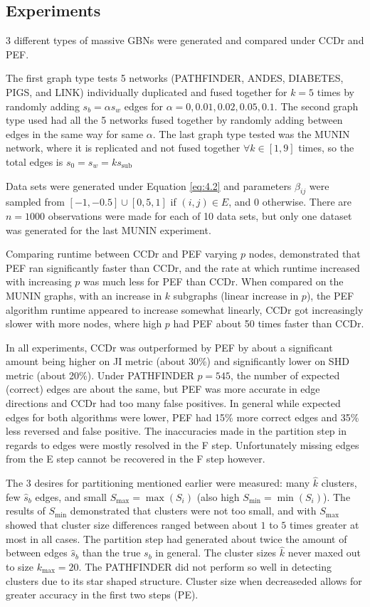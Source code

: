 \documentclass[twoside,11pt]{article}
\begin{document}
\subsection{Experiments}

3 different types of massive GBNs were generated and compared under CCDr and PEF.

The first graph type tests 5 networks (PATHFINDER, ANDES, DIABETES, PIGS, and LINK) individually duplicated and fused together for $k=5$ times by randomly adding $s_b=\alpha s_w$ edges for $\alpha=0,0.01,0.02,0.05,0.1$. The second graph type used had all the 5 networks fused together by randomly adding between edges in the same way for same $\alpha$. The last graph type tested was the MUNIN network, where it is replicated and not fused together $\forall k\in[1,9]$ times, so the total edges is $s_0=s_w=ks_\text{sub}$

Data sets were generated under Equation \eqref{eq:4.2} and parameters $\beta_{ij}$ were sampled from $[-1,-0.5]\cup[0,5,1]$ if $(i,j)\in E$, and $0$ otherwise. There are $n=1000$ observations were made for each of 10 data sets, but only one dataset was generated for the last MUNIN experiment.

Comparing runtime between CCDr and PEF varying $p$ nodes, demonstrated that PEF ran significantly faster than CCDr, and the rate at which runtime increased with increasing $p$ was much less for PEF than CCDr. When compared on the MUNIN graphs, with an increase in $k$ subgraphs (linear increase in $p$), the PEF algorithm runtime appeared to increase somewhat linearly, CCDr got increasingly slower with more nodes, where high $p$ had PEF about 50 times faster than CCDr.

In all experiments, CCDr was outperformed by PEF by about a significant amount being higher on JI metric (about 30\%) and significantly lower on SHD metric (about 20\%). Under PATHFINDER $p=545$, the number of expected (correct) edges are about the same, but PEF was more accurate in edge directions and CCDr had too many false positives. In general while expected edges for both algorithms were lower, PEF had 15\% more correct edges and 35\% less reversed and false positive. The inaccuracies made in the partition step in regards to edges were mostly resolved in the F step. Unfortunately missing edges from the E step cannot be recovered in the F step however.

The 3 desires for partitioning mentioned earlier were measured: many $\hat{k}$ clusters, few $\hat{s}_b$ edges, and small $S_\text{max}=\max(S_i)$ (also high $S_\text{min}=\min(S_i)$). The results of $S_\text{min}$ demonstrated that clusters were not too small, and with $S_\text{max}$ showed that cluster size differences ranged between about $1$ to $5$ times greater at most in all cases. The partition step had generated about twice the amount of between edges $\hat{s}_b$ than the true $s_b$ in general. The cluster sizes $\hat{k}$ never maxed out to size $k_\text{max}=20$. The PATHFINDER did not perform so well in detecting clusters due to its star shaped structure. Cluster size when decreaseded allows for greater accuracy in the first two steps (PE).
\end{document}
